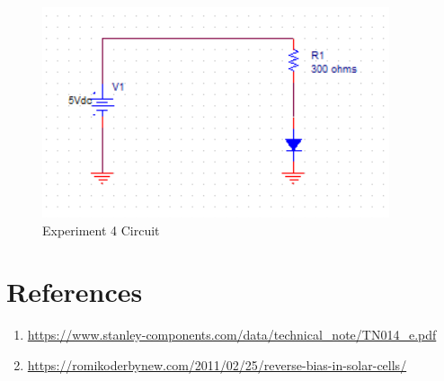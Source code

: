 \begin{figure}[h!]
	\centering
	\includegraphics{CircuitSchematic.PNG}
	\caption{Experiment 4 Circuit}
	\label{fig:Circuit_Pic}
\end{figure}

\section{References}
\scriptsize{
	\begin{enumerate}
		\item \url{https://www.stanley-components.com/data/technical_note/TN014_e.pdf}
		\item \url{https://romikoderbynew.com/2011/02/25/reverse-bias-in-solar-cells/}
	\end{enumerate}
}

